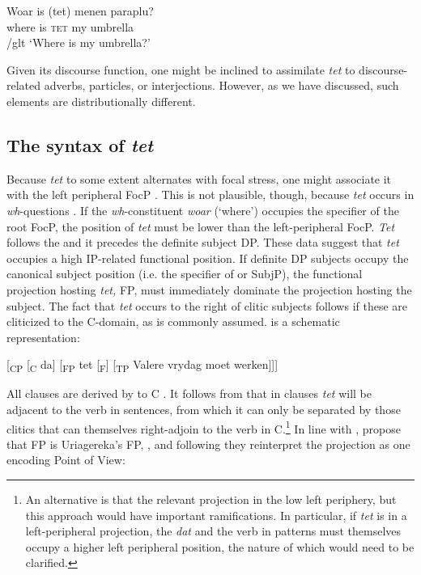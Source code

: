 \documentclass[output=paper]{LSP/langsci}
\begin{document}
\ea%
    \label{ex:Greco:36}
    \gll Woar    is    (tet)   menen paraplu?\\
         where    is  \textsc{tet}  my       umbrella\\
/glt `Where is my umbrella?'
\z


Given its discourse function, one might be inclined to assimilate \textit{tet} to dis\-course-related adverbs, particles, or interjections. However, as we have discussed, such elements are distributionally different.


\subsection{The syntax of \textit{tet}}\label{sec:Greco:5.3.}

Because \textit{tet} to some extent alternates with focal stress, one might associate it with the left peripheral FocP \citep{Rizzi1997}. This is not plausible, though, because \textit{tet} occurs in \textit{wh}{}-questions . If the \textit{wh}{}-constituent \textit{woar} (‘where’) occupies the specifier of the root FocP, the position of \textit{tet} must be lower than the left-peripheral FocP. \textit{Tet} follows the  and it precedes the definite subject DP. These data suggest that \textit{tet} occupies\textit{} a high IP-related functional position. If definite DP subjects occupy the canonical subject position (i.e. the specifier of  or SubjP), the functional projection hosting \textit{tet,} FP, must immediately dominate the projection hosting the subject. The fact that \textit{tet} occurs to the right of clitic subjects follows if these are cliticized to the C-domain, as is commonly assumed.   is a schematic representation:



\ea%
    \label{ex:Greco:37a}
    [\textsubscript{CP} [\textsubscript{C} da]   [\textsubscript{FP} tet [\textsubscript{F}]   [\textsubscript{TP} Valere vrydag moet werken]]]
\z

All  clauses are derived by   to C \citep{CraenenbroeckEtAl2007}. It follows from  that in  clauses \textit{tet} will be adjacent to the  verb in  sentences, from which it can only be separated by those clitics that can themselves right-adjoin to the  verb in C.\footnote{An alternative is that the relevant projection in the low left periphery, but this approach would have important ramifications. In particular, if \textit{tet} is in a left-peripheral projection, the  \textit{dat} and the  verb in  patterns must themselves occupy a higher left peripheral position, the nature of which would need to be clarified.} In line with \citet{CraenenbroeckEtAl2007}, \citet{CraenenbroeckEtAl2012,GuéronEtAl2012} propose that FP is Uriagereka’s FP, \citep{Uriagereka2004,Carrilho2008}, and following \citet{Grohmann2000} they reinterpret the projection as one encoding Point of View:
\end{document}
